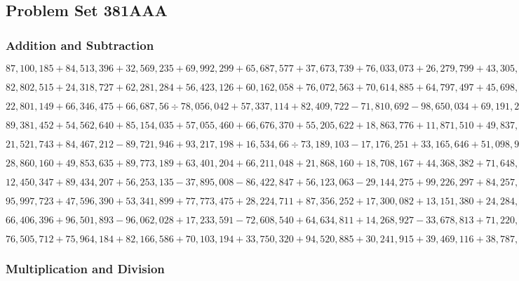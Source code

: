 \hypertarget{problem-set-381aaa}{%
\subsection{Problem Set 381AAA}\label{problem-set-381aaa}}

\hypertarget{addition-and-subtraction}{%
\subsubsection{Addition and
Subtraction}\label{addition-and-subtraction}}

\(87,100,185+84,513,396+32,569,235+69,992,299+65,687,577+37,673,739+76,033,073+26,279,799+43,305,027+55,882,630\)

\(82,802,515+24,318,727+62,281,284+56,423,126+60,162,058+76,072,563+70,614,885+64,797,497+45,698,557+92,470,233\)

\(22,801,149+66,346,475+66,687,56÷78,056,042+57,337,114+82,409,722-71,810,692-98,650,034+69,191,292-30,838,976\)

\(89,381,452+54,562,640+85,154,035+57,055,460+66,676,370+55,205,622+18,863,776+11,871,510+49,837,116+26,541,433\)

\(21,521,743+84,467,212-89,721,946+93,217,198+16,534,66÷73,189,103-17,176,251+33,165,646+51,098,905-94,475,406\)

\(28,860,160+49,853,635+89,773,189+63,401,204+66,211,048+21,868,160+18,708,167+44,368,382+71,648,612+17,263,334\)

\(12,450,347+89,434,207+56,253,135-37,895,008-86,422,847+56,123,063-29,144,275+99,226,297+84,257,969-78,198,710\)

\(95,997,723+47,596,390+53,341,899+77,773,475+28,224,711+87,356,252+17,300,082+13,151,380+24,284,555+87,146,799\)

\(66,406,396+96,501,893-96,062,028+17,233,591-72,608,540+64,634,811+14,268,927-33,678,813+71,220,523-34,705,955\)

\(76,505,712+75,964,184+82,166,586+70,103,194+33,750,320+94,520,885+30,241,915+39,469,116+38,787,142+68,143,167\)

\hypertarget{multiplication-and-division}{%
\subsubsection{Multiplication and
Division}\label{multiplication-and-division}}

